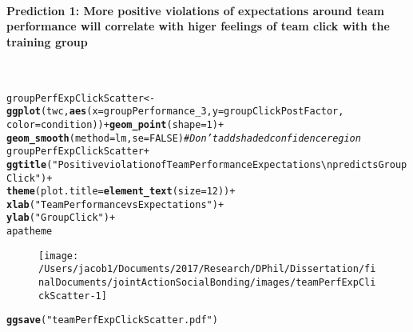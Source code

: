 \documentclass[english]{article}\usepackage[]{graphicx}\usepackage[]{color}
\makeatletter
\def\maxwidth{ %
  \ifdim\Gin@nat@width>\linewidth
    \linewidth
  \else
    \Gin@nat@width
  \fi
}
\newcommand{\hlnum}[1]{\textcolor[rgb]{0.686,0.059,0.569}{#1}}%
\newcommand{\hlstr}[1]{\textcolor[rgb]{0.192,0.494,0.8}{#1}}%
\newcommand{\hlcom}[1]{\textcolor[rgb]{0.678,0.584,0.686}{\textit{#1}}}%
\newcommand{\hlopt}[1]{\textcolor[rgb]{0,0,0}{#1}}%
\newcommand{\hlstd}[1]{\textcolor[rgb]{0.345,0.345,0.345}{#1}}%
\newcommand{\hlkwb}[1]{\textcolor[rgb]{0.69,0.353,0.396}{#1}}%
\newcommand{\hlkwc}[1]{\textcolor[rgb]{0.333,0.667,0.333}{#1}}%
\newcommand{\hlkwd}[1]{\textcolor[rgb]{0.737,0.353,0.396}{\textbf{#1}}}%
\newenvironment{kframe}{%
 \def\at@end@of@kframe{}%
 \ifinner\ifhmode%
  \def\at@end@of@kframe{\end{minipage}}%
  \begin{minipage}{\columnwidth}%
 \fi\fi%
 \def\FrameCommand##1{\hskip\@totalleftmargin \hskip-\fboxsep
 \colorbox{shadecolor}{##1}\hskip-\fboxsep
     \hskip-\linewidth \hskip-\@totalleftmargin \hskip\columnwidth}%
 \MakeFramed {\advance\hsize-\width
   \@totalleftmargin\z@ \linewidth\hsize
   \@setminipage}}%
 {\par\unskip\endMakeFramed%
 \at@end@of@kframe}
\newenvironment{knitrout}{}{} %
\newcommand{\myparagraph}[1]{\paragraph{#1}\mbox{}\\}
\makeatother
\begin{document}
\myparagraph{Prediction 1: More positive violations of expectations around team performance will correlate with higer feelings of team click with the training group}

\begin{knitrout}
\color{fgcolor}\begin{kframe}
\begin{alltt}
  \hlstd{groupPerfExpClickScatter} \hlkwb{<-} \hlkwd{ggplot}\hlstd{(twc,} \hlkwd{aes}\hlstd{(}\hlkwc{x}\hlstd{=groupPerformance_3,} \hlkwc{y}\hlstd{=groupClickPostFactor,}
                              \hlkwc{color}\hlstd{=condition))} \hlopt{+} \hlkwd{geom_point}\hlstd{(}\hlkwc{shape} \hlstd{=} \hlnum{1}\hlstd{)} \hlopt{+}
                              \hlkwd{geom_smooth}\hlstd{(}\hlkwc{method}\hlstd{=lm,} \hlkwc{se}\hlstd{=}\hlnum{FALSE}\hlstd{)}   \hlcom{# Don't add shaded confidence region}
  \hlstd{groupPerfExpClickScatter} \hlopt{+}
              \hlkwd{ggtitle}\hlstd{(}\hlstr{"Positive violation of Team Performance Expectations \textbackslash{}n predicts Group Click"}\hlstd{)} \hlopt{+}
              \hlkwd{theme}\hlstd{(}\hlkwc{plot.title} \hlstd{=} \hlkwd{element_text}\hlstd{(}\hlkwc{size}\hlstd{=}\hlnum{12}\hlstd{))} \hlopt{+}
              \hlkwd{xlab}\hlstd{(}\hlstr{"Team Performance vs Expectations"}\hlstd{)} \hlopt{+}
              \hlkwd{ylab}\hlstd{(}\hlstr{"Group Click"}\hlstd{)} \hlopt{+}
              \hlstd{apatheme}
\end{alltt}


{\ttfamily\noindent\color{warningcolor}{\#\# Warning: Removed 1 rows containing non-finite values (stat\_smooth).}}

{\ttfamily\noindent\color{warningcolor}{\#\# Warning: Removed 1 rows containing missing values (geom\_point).}}\end{kframe}\begin{figure}

{\centering \texttt{[image: /Users/jacob1/Documents/2017/Research/DPhil/Dissertation/finalDocuments/jointActionSocialBonding/images/teamPerfExpClickScatter-1]} 

}

\end{figure}

\begin{kframe}\begin{alltt}
              \hlkwd{ggsave}\hlstd{(}\hlstr{"teamPerfExpClickScatter.pdf"}\hlstd{)}
\end{alltt}


{\ttfamily\noindent\itshape\color{messagecolor}{\#\# Saving 3.5 x 3.5 in image}}

{\ttfamily\noindent\color{warningcolor}{\#\# Warning: Removed 1 rows containing non-finite values (stat\_smooth).}}

{\ttfamily\noindent\color{warningcolor}{\#\# Warning: Removed 1 rows containing missing values (geom\_point).}}\end{kframe}
\end{knitrout}
\end{document}
